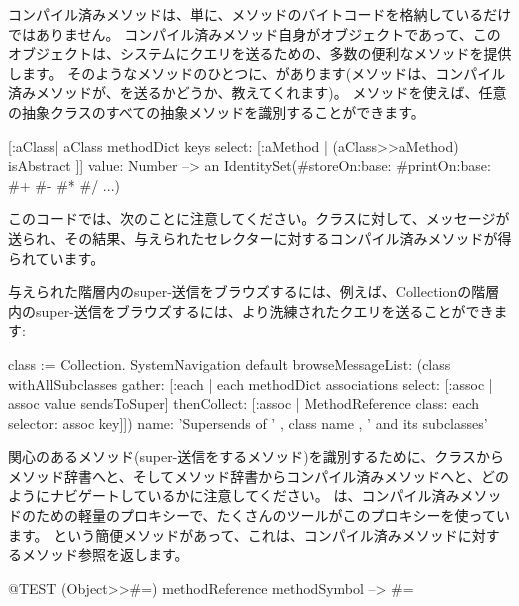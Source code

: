 \documentclass[a4paper,10pt,twoside]{book}
\begin{document}
コンパイル済みメソッドは、単に、メソッドのバイトコードを格納しているだけではありません。
コンパイル済みメソッド自身がオブジェクトであって、このオブジェクトは、システムにクエリを送るための、多数の便利なメソッドを提供します。
そのようなメソッドのひとつに、があります(メソッドは、コンパイル済みメソッドが、を送るかどうか、教えてくれます)。
メソッドを使えば、任意の抽象クラスのすべての抽象メソッドを識別することができます。
\begin{code}{}
[:aClass| aClass methodDict keys select: [:aMethod |
  (aClass>>aMethod) isAbstract ]] value: Number
  --> an IdentitySet(#storeOn:base: #printOn:base: #+ #- #* #/ ...)
\end{code}
このコードでは、次のことに注意してください。クラスに対して、\ct{>>}メッセージが送られ、その結果、与えられたセレクターに対するコンパイル済みメソッドが得られています。


与えられた階層内のsuper-送信をブラウズするには、例えば、Collectionの階層内のsuper-送信をブラウズするには、より洗練されたクエリを送ることができます:
\begin{code}{}
class := Collection.
SystemNavigation default
  browseMessageList: (class withAllSubclasses gather: [:each |
    each methodDict associations
      select: [:assoc | assoc value sendsToSuper]
      thenCollect: [:assoc | MethodReference class: each selector: assoc key]])
  name: 'Supersends of ' , class name , ' and its subclasses'
\end{code}
関心のあるメソッド(super-送信をするメソッド)を識別するために、クラスからメソッド辞書へと、そしてメソッド辞書からコンパイル済みメソッドへと、どのようにナビゲートしているかに注意してください。
は、コンパイル済みメソッドのための軽量のプロキシーで、たくさんのツールがこのプロキシーを使っています。
という簡便メソッドがあって、これは、コンパイル済みメソッドに対するメソッド参照を返します。%
\begin{code}{@TEST}
(Object>>#=) methodReference methodSymbol --> #=
\end{code}
\end{document}
